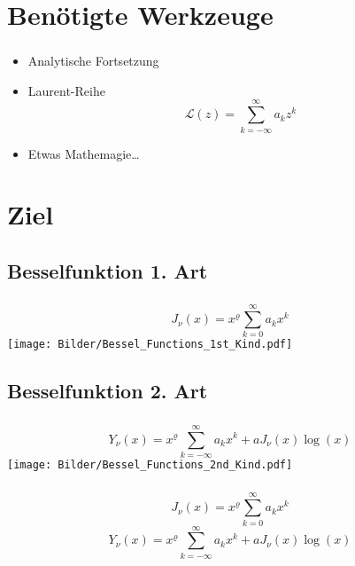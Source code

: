 \documentclass{beamer}
\newenvironment{slide}
{\begin{frame}[environment=slide]
	\frametitle{\insertsection}
	\framesubtitle{\insertsubsection}}
{\end{frame}}
\begin{document}
\section{Benötigte Werkzeuge}
	\begin{slide}
		\begin{itemize}
			\item Analytische Fortsetzung
			\item Laurent-Reihe $$\mathcal{L}(z)=\sum_{k=-\infty}^{\infty}a_kz^k $$
			\item Etwas Mathemagie\ldots
		\end{itemize}
	\end{slide}
	
\section{Ziel}
\subsection{Besselfunktion 1. Art}
	\begin{slide}
		\centering
		$$J_\nu(x)=x^\varrho\sum_{k=0}^{\infty}a_kx^k$$
		\texttt{[image: Bilder/Bessel\_Functions\_1st\_Kind.pdf]}
	\end{slide}
\subsection{Besselfunktion 2. Art}
	\begin{slide}
		\centering
		$$Y_\nu(x)=x^\varrho\sum_{k=-\infty}^{\infty}a_kx^k+aJ_\nu(x)\log(x)$$
		\texttt{[image: Bilder/Bessel\_Functions\_2nd\_Kind.pdf]}
	\end{slide}

	\begin{slide}
		$$J_\nu(x)=x^\varrho\sum_{k=0}^{\infty}a_kx^k$$
		$$Y_\nu(x)=x^\varrho\sum_{k=-\infty}^{\infty}a_kx^k+aJ_\nu(x)\log(x) $$
		\begin{figure}
		\end{figure}
	\end{slide}
\end{document}
